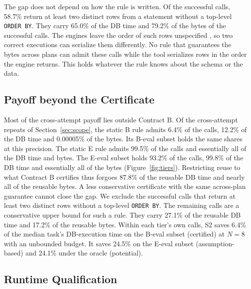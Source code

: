 The gap does not depend on how the rule is written. Of the successful calls, 58.7\% return at least two distinct
rows from a statement without a top-level \texttt{ORDER BY}. They carry 65.0\% of the DB time and 79.2\% of the
bytes of the successful calls. The engines leave the order of such rows unspecified
\cite{postgres2026order,sqlite2026select,mongodb2026sort}, so two correct executions can serialize them differently.
No rule that guarantees the bytes across plans can admit these calls while the tool serializes rows in the order the
engine returns. This holds whatever the rule knows about the schema or the data.

\subsection{Payoff beyond the Certificate}
\label{sec:gap}

Most of the cross-attempt payoff lies outside Contract B. Of the cross-attempt repeats of Section~\ref{sec:scope},
the static B rule admits 6.4\% of the calls, 12.2\% of the DB time and 0.00005\% of the bytes. Its B-eval subset
holds the same shares at this precision. The static E rule admits 99.5\% of the calls and essentially all of the DB
time and bytes. The E-eval subset holds 93.2\% of the calls, 99.8\% of the DB time and essentially all of the bytes
(Figure~\ref{fig:tiers}). Restricting reuse to what Contract B certifies thus forgoes 87.8\% of the reusable DB time
and nearly all of the reusable bytes. A less conservative certificate with the same across-plan guarantee cannot
close the gap. We exclude the successful calls that return at least two distinct rows without a top-level
\texttt{ORDER BY}. The remaining calls are a conservative upper bound for such a rule. They carry 27.1\% of the
reusable DB time and 17.2\% of the reusable bytes. Within each tier's own calls, S2 saves 6.4\% of the median task's
DB-execution time on the B-eval subset (certified) at $N=8$ with an unbounded budget. It saves 24.5\% on the E-eval
subset (assumption-based) and 24.1\% under the oracle (potential).

\subsection{Runtime Qualification}
\label{sec:pinning}

